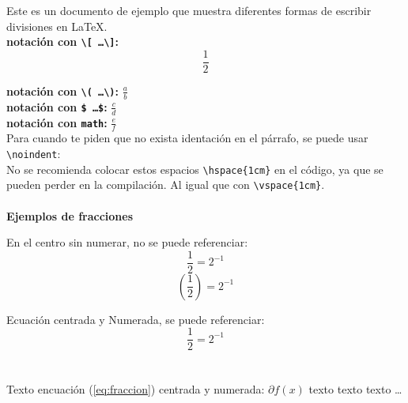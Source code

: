 \documentclass{article}
\begin{document}
Este es un documento de ejemplo que muestra diferentes formas de escribir divisiones en \LaTeX.
\\

\textbf{notación con \texttt{\textbackslash[ \dots \textbackslash]}:}
\[ \frac{1}{2} \]

\textbf{notación con \texttt{\textbackslash( \dots \textbackslash)}:}
\( \frac{a}{b} \)
\\

\textbf{notación con \texttt{\$ \dots \$}:}
$ \frac{c}{d} $
\\

\textbf{notación con \texttt{math}:}
\begin{math}
\frac{e}{f}
\end{math}
\\

\noindent Para cuando te piden que no exista identación en el párrafo, se puede usar \texttt{\textbackslash noindent}:
\\

No se recomienda colocar estos espacios \texttt{\textbackslash hspace\{1cm\}} en el código, ya que se pueden perder en la compilación.
Al igual que con \texttt{\textbackslash vspace\{1cm\}}.
\\ \\

\textbf{Ejemplos de fracciones}

En el centro sin numerar, no se puede referenciar:
    \[\frac{1}{2} = 2^{-1}\]
    \begin{displaymath}
        \left( \frac{1}{2} \right) = 2^{-1}
    \end{displaymath}

Ecuación centrada y Numerada, se puede referenciar:
{\Huge
\begin{equation}
    \frac{1}{2} = 2^{-1}
    \label{eq:fraccion} %
\end{equation}}
\\ \\

Texto encuación (\ref{eq:fraccion}) centrada y numerada: 
    $\partial{f(x)}$ texto texto texto \dots
\\
\end{document}
